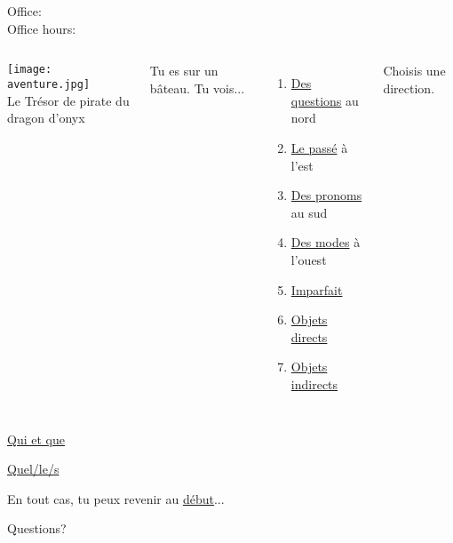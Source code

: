 \documentclass{beamer}
\subtitle[Révision, examen 1]{Révision pour l'examen 1}
\begin{document}
  \begin{frame}
    \titlepage
    \tiny{Office: \\
          Office hours: }
  \end{frame}

  \begin{frame}{}
    \hypertarget{début}{}
    \begin{columns}
        \begin{center}
          \texttt{[image: aventure.jpg]} \\
          Le Trésor de pirate du dragon d'onyx
        \end{center}
        Tu es sur un bâteau.
        Tu vois...
        \begin{enumerate}
          \item \hyperlink{questions}{Des questions} au nord
          \item \hyperlink{passé}{Le passé} à l'est
          \item \hyperlink{pronoms}{Des pronoms} au sud
          \item \hyperlink{modes}{Des modes} à l'ouest
          \item \hyperlink{imparfait}{Imparfait}
          \item \hyperlink{direct}{Objets directs}
          \item \hyperlink{indirect}{Objets indirects}
        \end{enumerate}
        Choisis une direction.
    \end{columns}
  \end{frame}

  \begin{frame}{}
    \hypertarget{questions}{}
    
    \item \hyperlink{que}{Qui et que}
    \item \hyperlink{quel}{Quel/le/s}

    En tout cas, tu peux revenir au \hyperlink{début}{début}...
  \end{frame}

  \begin{frame}{}
    \begin{center}
      \Large Questions?
    \end{center}
  \end{frame}
\end{document}
